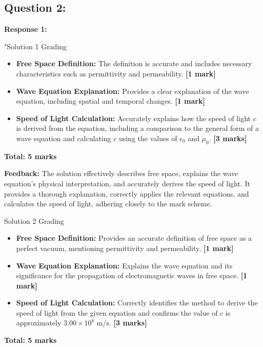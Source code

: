 \documentclass[a4paper,11pt]{article}
\begin{document}
\subsection*{Question 2:}

\textbf{Response 1:}

"Solution 1 Grading

\begin{itemize}
    \item \textbf{Free Space Definition:} The definition is accurate and includes necessary characteristics such as permittivity and permeability. \textbf{[1 mark]}
    \item \textbf{Wave Equation Explanation:} Provides a clear explanation of the wave equation, including spatial and temporal changes. \textbf{[1 mark]}
    \item \textbf{Speed of Light Calculation:} Accurately explains how the speed of light \(c\) is derived from the equation, including a comparison to the general form of a wave equation and calculating \(c\) using the values of \(\epsilon_{0}\) and \(\mu_{0}\). \textbf{[3 marks]}
\end{itemize}

\textbf{Total: 5 marks}

\textbf{Feedback:} The solution effectively describes free space, explains the wave equation's physical interpretation, and accurately derives the speed of light. It provides a thorough explanation, correctly applies the relevant equations, and calculates the speed of light, adhering closely to the mark scheme.

Solution 2 Grading

\begin{itemize}
    \item \textbf{Free Space Definition:} Provides an accurate definition of free space as a perfect vacuum, mentioning permittivity and permeability. \textbf{[1 mark]}
    \item \textbf{Wave Equation Explanation:} Explains the wave equation and its significance for the propagation of electromagnetic waves in free space. \textbf{[1 mark]}
    \item \textbf{Speed of Light Calculation:} Correctly identifies the method to derive the speed of light from the given equation and confirms the value of \(c\) is approximately \(3.00 \times 10^8\) m/s. \textbf{[3 marks]}
\end{itemize}

\textbf{Total: 5 marks}
\end{document}
